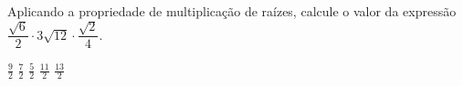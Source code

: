 Aplicando a propriedade de multiplicação de raízes, calcule o valor da expressão $\dfrac{\sqrt{6}}{2}\cdot 3\sqrt{12}\cdot\dfrac{\sqrt{2}}{4}$.

$\frac{9}{2}$
$\frac{7}{2}$
$\frac{5}{2}$
$\frac{11}{2}$
$\frac{13}{2}$


